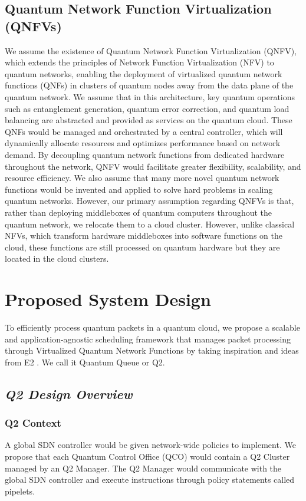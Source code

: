 \documentclass[sigplan,screen]{acmart}
\begin{document}
\subsection{Quantum Network Function Virtualization (QNFVs)}
We assume the existence of Quantum Network Function Virtualization (QNFV), which extends the principles of Network Function Virtualization (NFV) to quantum networks, enabling the deployment of virtualized quantum network functions (QNFs) in clusters of quantum nodes away from the data plane of the quantum network. We assume that in this architecture, key quantum operations such as entanglement generation, quantum error correction, and quantum load balancing are abstracted and provided as services on the quantum cloud. These QNFs would be managed and orchestrated by a central controller, which will dynamically allocate resources and optimizes performance based on network demand. By decoupling quantum network functions from dedicated hardware throughout the network, QNFV would facilitate greater flexibility, scalability, and resource efficiency. We also assume that many more novel quantum network functions would be invented and applied to solve hard problems in scaling quantum networks. However, our primary assumption regarding QNFVs is that, rather than deploying middleboxes of quantum computers throughout the quantum network, we relocate them to a cloud cluster. However, unlike classical NFVs, which transform hardware middleboxes into software functions on the cloud, these functions are still processed on quantum hardware but they are located in the cloud clusters.

\section{Proposed System Design}

To efficiently process quantum packets in a quantum cloud, we propose a scalable and application-agnostic scheduling framework that manages packet processing through Virtualized Quantum Network Functions by taking inspiration and ideas from E2 \cite{e2}. We call it Quantum Queue or Q2.  

\subsection{\textit{Q2 Design Overview}}

\subsubsection{Q2 Context}A global SDN controller would be given network-wide policies to implement. We propose that each Quantum Control Office (QCO) would contain a Q2 Cluster managed by an Q2 Manager. The Q2 Manager would communicate with the global SDN controller and execute instructions through policy statements called pipelets.
\end{document}
